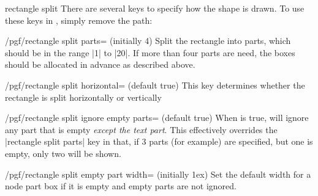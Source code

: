 \begin{shape}{rectangle split}
  There are several \pgfname{} keys to specify how the shape is
  drawn. To use these keys in \tikzname, simply remove the 
   path:
  
\begin{key}{/pgf/rectangle split parts= (initially 4)}
  Split the rectangle into  parts, 
  which should be in the range |1| to |20|. If more than four parts
  are need, the boxes should be allocated in advance as
  described above.
  
\begin{codeexample}[]
\end{codeexample} 
\end{key}

\begin{key}{/pgf/rectangle split horizontal= (default true)}
  This key determines whether the rectangle is split horizontally or vertically
 \end{key}
  
  \begin{key}{/pgf/rectangle split ignore empty parts= (default true)}
    When  is true, \pgfname{} will ignore any part 
    that is empty \emph{except the text part}. 
    This effectively overrides the |rectangle split parts| key in that, if 
    3 parts (for example) are specified, but one is empty, only
    two will be shown.
    
\begin{codeexample}[]
\end{codeexample}
  \end{key}
%  
	\begin{key}{/pgf/rectangle split empty part width= (initially 1ex)}
    Set the default width for a node part box if it is empty and
    empty parts are not ignored.
  \end{key}
  

\end{shape}
